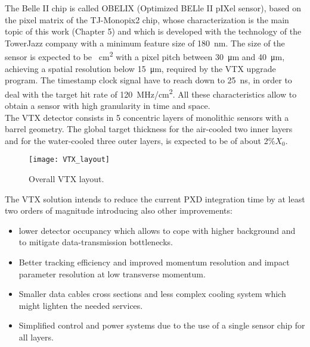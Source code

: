 \begin{comment}
The program hopes to solve some of the issues discussed in the previous chapters, with a new system of two inner layers and three outermost, for a total of 5 stages equipped with a single sensro type, called \textbf{VTX} (layout in~\autoref{fig:VTX_layout}). Also the mechanical structure has been redesigned but it is expected that the all system could work at room temperature, so as consequence an important reduction of services is also contemplated.\\
\end{comment}

The Belle II chip is called OBELIX (Optimized BELle II pIXel sensor), based on the pixel matrix of the TJ-Monopix2 chip, whose characterization is the main topic of this work (Chapter 5) and which is developed with the technology of the TowerJazz company with a minimum feature size of \SI{180}{nm}. 
The size of the sensor is expected to be ~\unit{cm^{2}} with a pixel pitch between \SI{30}{\micro m} and \SI{40}{\micro m}, achieving a spatial resolution below \SI{15}{\micro m}, required by the VTX upgrade program. The timestamp clock signal have to reach down to \SI{25}{ns}, in order to deal with the target hit rate of \SI{120}{MHz/ cm^{2}}. All these characteristics allow to obtain a sensor with high granularity in time and space.\\

The VTX detector consists in 5 concentric layers of monolithic sensors with a barrel geometry. The global target thickness for the air-cooled two inner layers and for the water-cooled three outer layers, is expected to be of about 2\%$X_{0}$.

\begin{figure}[h!]
\centering
\texttt{[image: VTX\_layout]}
\caption{Overall VTX layout.}
\label{fig:VTX_layout}
\end{figure}

The VTX solution intends to reduce the current PXD integration time by at least two orders of magnitude introducing also other improvements:

\begin{itemize}
\item lower detector occupancy which allows to cope with higher background and to mitigate data-transmission bottlenecks.
\item Better tracking efficiency and improved momentum resolution and impact parameter resolution at low transverse momentum.
\item Smaller data cables cross sections and less complex cooling system which might lighten the needed services.
\item Simplified control and power systems due to the use of a single sensor chip for all layers.
\end{itemize}

